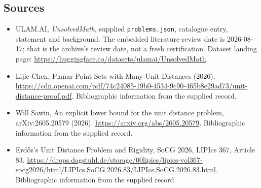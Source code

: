 \documentclass[11pt,a4paper]{article}
\begin{document}
\subsection{Sources}

{\small

\begin{itemize}

\item[\hypertarget{source:statement:1}{S1}] ULAM.AI, \emph{UnsolvedMath}, supplied \texttt{problems.json}, catalogue entry, statement and background. The embedded literature-review date is 2026-08-17; that is the archive’s review date, not a fresh certification. Dataset landing page: \url{https://huggingface.co/datasets/ulamai/UnsolvedMath}.

\item[\hypertarget{source:statement:2}{S2}] Lijie Chen, Planar Point Sets with Many Unit Distances (2026). \url{https://cdn.openai.com/pdf/74c24085-19b0-4534-9c90-465b8e29ad73/unit-distance-proof.pdf}. Bibliographic information from the supplied record.

\item[\hypertarget{source:statement:3}{S3}] Will Sawin, An explicit lower bound for the unit distance problem, arXiv:2605.20579 (2026). \url{https://arxiv.org/abs/2605.20579}. Bibliographic information from the supplied record.

\item[\hypertarget{source:statement:4}{S4}] Erdős's Unit Distance Problem and Rigidity, SoCG 2026, LIPIcs 367, Article 83. \url{https://drops.dagstuhl.de/storage/00lipics/lipics-vol367-socg2026/html/LIPIcs.SoCG.2026.83/LIPIcs.SoCG.2026.83.html}. Bibliographic information from the supplied record.

\end{itemize}

}

\label{end:statement}
\end{document}
